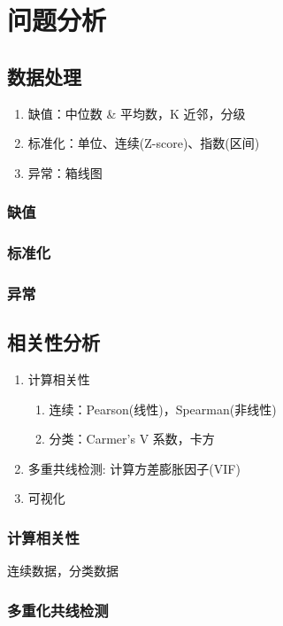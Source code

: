 \section*{问题分析}
\subsection*{数据处理}
\begin{enumerate}
  \renewcommand{\labelenumi}{(\alph*)}
  \item 缺值：中位数 \& 平均数，K 近邻，分级
  \item 标准化：单位、连续(Z-score)、指数(区间)
  \item 异常：箱线图
\end{enumerate}
\subsubsection*{缺值}
\subsubsection*{标准化}
\subsubsection*{异常}

\subsection*{相关性分析}
\begin{enumerate}
  \renewcommand{\labelenumi}{(\arabic*)}
  \item 计算相关性
    \begin{enumerate}
      \renewcommand{\labelenumi}{(\alph*)}
      \item 连续：Pearson(线性)，Spearman(非线性)
      \item 分类：Carmer's V 系数，卡方
    \end{enumerate}
  \item 多重共线检测: 计算方差膨胀因子(VIF)
  \item 可视化
\end{enumerate}
\subsubsection*{计算相关性}
连续数据，分类数据
\subsubsection*{多重化共线检测}
